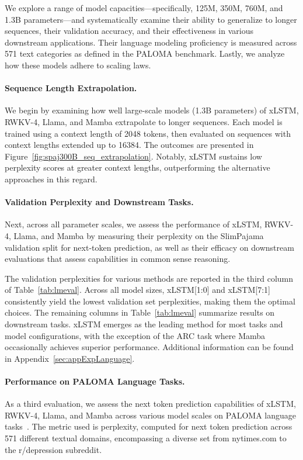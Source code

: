We explore a range of model capacities—specifically, 125M, 350M, 760M, and 1.3B parameters—and systematically examine their ability to generalize to longer sequences, their validation accuracy, and their effectiveness in various downstream applications. Their language modeling proficiency is measured across 571 text categories as defined in the PALOMA benchmark. Lastly, we analyze how these models adhere to scaling laws.

\paragraph{Sequence Length Extrapolation.}
\label{sec:spaj300B_ctx_extrapolation}
We begin by examining how well large-scale models (1.3B parameters) of xLSTM, RWKV-4, Llama, and Mamba extrapolate to longer sequences. Each model is trained using a context length of 2048 tokens, then evaluated on sequences with context lengths extended up to 16384. The outcomes are presented in Figure~\ref{fig:spaj300B_seq_extrapolation}. Notably, xLSTM sustains low perplexity scores at greater context lengths, outperforming the alternative approaches in this regard.

\paragraph{Validation Perplexity and Downstream Tasks.}
\label{sec:spaj_downstream_eval}
Next, across all parameter scales, we assess the performance of xLSTM, RWKV-4, Llama, and Mamba by measuring their perplexity on the SlimPajama validation split for next-token prediction, as well as their efficacy on downstream evaluations that assess capabilities in common sense reasoning.

The validation perplexities for various methods are reported in the third column of Table~\ref{tab:lmeval}. Across all model sizes, xLSTM[1:0] and xLSTM[7:1] consistently yield the lowest validation set perplexities, making them the optimal choices. The remaining columns in Table~\ref{tab:lmeval} summarize results on downstream tasks. xLSTM emerges as the leading method for most tasks and model configurations, with the exception of the ARC task where Mamba occasionally achieves superior performance. Additional information can be found in Appendix~\ref{sec:appExpLanguage}.

\paragraph{Performance on PALOMA Language Tasks.} As a third evaluation, we assess the next token prediction capabilities of xLSTM, RWKV-4, Llama, and Mamba across various model scales on PALOMA language tasks~\citep{Magnusson:23arxivshort}. The metric used is perplexity, computed for next token prediction across 571 different textual domains, encompassing a diverse set from nytimes.com to the r/depression subreddit.

